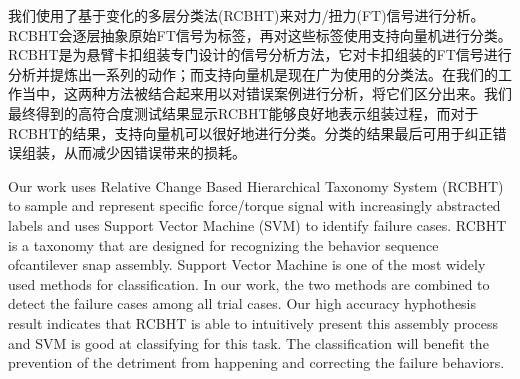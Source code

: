 %

\begin{cabstract}
    我们使用了基于变化的多层分类法(RCBHT)来对力/扭力(FT)信号进行分析。RCBHT会逐层抽象原始FT信号为标签，再对这些标签使用支持向量机进行分类。RCBHT是为悬臂卡扣组装专门设计的信号分析方法，它对卡扣组装的FT信号进行分析并提炼出一系列的动作；而支持向量机是现在广为使用的分类法。在我们的工作当中，这两种方法被结合起来用以对错误案例进行分析，将它们区分出来。我们最终得到的高符合度测试结果显示RCBHT能够良好地表示组装过程，而对于RCBHT的结果，支持向量机可以很好地进行分类。分类的结果最后可用于纠正错误组装，从而减少因错误带来的损耗。
\end{cabstract}

\begin{eabstract}
    Our work uses Relative Change Based Hierarchical Taxonomy System (RCBHT) to sample and represent specific force/torque signal with increasingly abstracted labels and uses Support Vector Machine (SVM) to identify failure cases. RCBHT is a taxonomy that are designed for recognizing the behavior sequence ofcantilever snap assembly. Support Vector Machine is one of the most widely used methods for classification. In our work, the two methods are combined to detect the failure cases among all trial cases. Our high accuracy hyphothesis result indicates that RCBHT is able to intuitively present this assembly process and SVM is good at classifying for this task. The classification will benefit the prevention of the detriment from happening and correcting the failure behaviors.
\end{eabstract}

